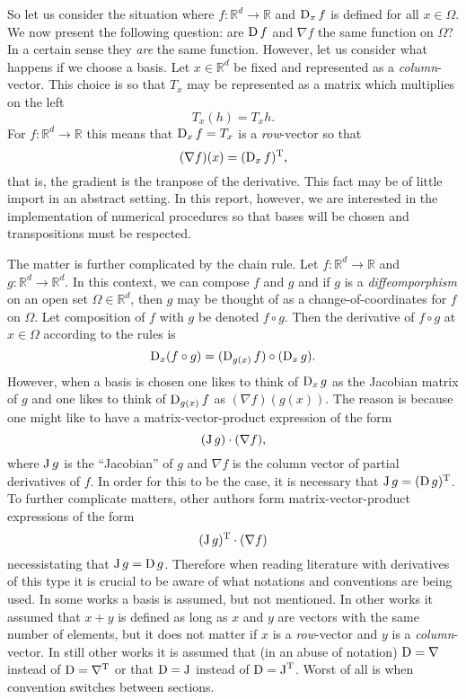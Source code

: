    So let us consider the situation where \(f:\mathbb{R}^d \to \mathbb{R}\)
    and \(\operatorname{D}_x f\) is defined for all \(x \in \Omega\). We now present the following
    question: are \(\operatorname{D} f\) and \(\nabla f\) the same function on \(\Omega\)? 
    In a certain sense they \emph{are} the same function. However, let us consider
    what happens if we choose a basis. Let \(x \in \mathbb{R}^d\) be fixed and
    represented as a \emph{column}-vector. This choice is so that \(T_x\) may be represented 
    as a matrix which multiplies on the left
    \[
        T_x(h) = T_x h.
    \]
    For \(f:\mathbb{R}^d \to \mathbb{R}\) this means that \(\operatorname{D}_x f = T_x\) is
    a \emph{row}-vector so that
    \begin{equation}
        \label{eqn:DerivTranspose}
        (\nabla f)(x) = (\operatorname{D}_x f)^{\mathrm{T}},
    \end{equation}
    that is, the gradient is the tranpose of the derivative. This fact may be of 
    little import in an abstract setting. In this report, however, we are interested 
    in the implementation of numerical procedures so that bases will be chosen and 
    transpositions must be respected.

    The matter is further complicated by the chain rule.
    Let \(f:\mathbb{R}^d \to \mathbb{R}\) and \(g:\mathbb{R}^d \to \mathbb{R}^d\).
    In this context, we can compose \(f\) and \(g\) and if \(g\)
    is a \emph{diffeomporphism} on an open set \(\Omega \in \mathbb{R}^d\), then
    \(g\) may be thought of as a change-of-coordinates for \(f\) on \(\Omega\).
    Let composition of \(f\) with \(g\) be denoted \(f \circ g\). Then the derivative
    of \(f \circ g\) at \(x \in \Omega\) according to the \Frechet rules is
    \[
        \operatorname{D}_x (f \circ g) = (\operatorname{D}_{g(x)} f) \circ (\operatorname{D}_x g).
    \]
    However, when a basis is chosen one likes to think of \(\operatorname{D}_x g\) as the
    Jacobian matrix of \(g\) and one likes to think of \(\operatorname{D}_{g(x)} f\)
    as \((\nabla f)(g(x))\). The reason is because one might like to
    have a matrix-vector-product expression of the form
    \[
        (\operatorname{J} g) \cdot (\nabla f),
    \]
    where \(\operatorname{J} g\) is the ``Jacobian'' of \(g\) and \(\nabla f\) is
    the column vector of partial derivatives of \(f\). In order
    for this to be the case, it is necessary that \(\operatorname{J} g = (\operatorname{D} g)^{\mathrm{T}}\).
    To further complicate matters, other authors form matrix-vector-product
    expressions of the form
    \[
        (\operatorname{J} g)^{\mathrm{T}} \cdot (\nabla f)
    \]
    necessistating that \(\operatorname{J} g = \operatorname{D} g\). Therefore when reading
    literature with derivatives of this type it is crucial to be
    aware of what notations and conventions are being used.
    In some works a basis is assumed, but not mentioned. 
    In other works it assumed that \(x + y\) is defined
    as long as \(x\) and \(y\) are vectors with the same
    number of elements, but it does not matter if \(x\)
    is a \emph{row}-vector and \(y\) is a \emph{column}-vector. In
    still other works it is assumed that (in an abuse of notation)
    \(\operatorname{D} = \nabla\) instead of \(\operatorname{D} = \nabla^{\mathrm{T}}\) or that \(\operatorname{D} = \operatorname{J}\)
    instead of \(\operatorname{D} = \operatorname{J}^{\mathrm{T}}\). Worst of all is when
    convention switches between sections.
   
